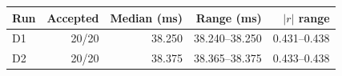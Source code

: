 \begin{tabular}{@{}lrrrr@{}}
\toprule
Run & Accepted & Median (ms) & Range (ms) & $|r|$ range \\
\midrule
D1 & 20/20 & 38.250 & 38.240--38.250 & 0.431--0.438 \\
D2 & 20/20 & 38.375 & 38.365--38.375 & 0.433--0.438 \\
\bottomrule
\end{tabular}
